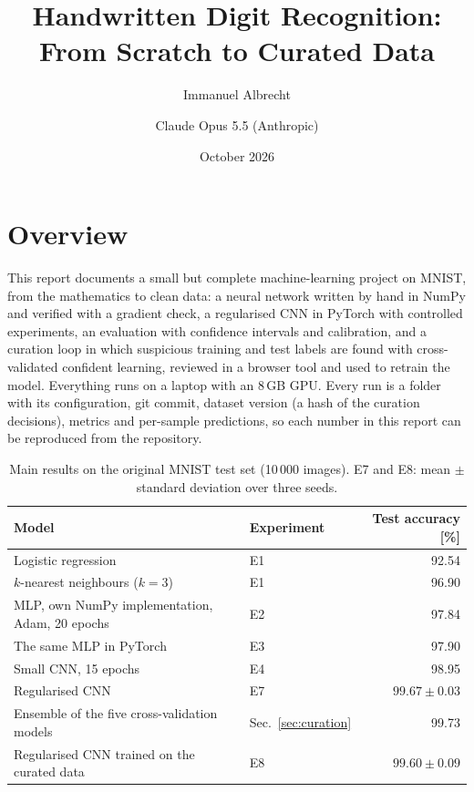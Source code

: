 \documentclass[11pt,a4paper]{article}
\title{Handwritten Digit Recognition: From Scratch to Curated Data}
\author{Immanuel Albrecht \and Claude Opus 5.5 (Anthropic)}
\date{October 2026}
\newcommand{\1}{\mathbf{1}}
\begin{document}
\maketitle


\section{Overview}
\label{sec:overview}

This report documents a small but complete machine-learning project on MNIST, from the
mathematics to clean data: a neural network written by hand in NumPy and verified with a
gradient check, a regularised CNN in PyTorch with controlled experiments, an evaluation with
confidence intervals and calibration, and a curation loop in which suspicious training and test
labels are found with cross-validated confident learning, reviewed in a browser tool and used to
retrain the model. Everything runs on a laptop with an 8\,GB GPU. Every run is a folder with its
configuration, git commit, dataset version (a hash of the curation decisions), metrics and
per-sample predictions, so each number in this report can be reproduced from the repository.

\begin{table}[ht]
  \centering
  \small
  \caption{Main results on the original MNIST test set (10\,000 images). E7 and E8: mean
    $\pm$ standard deviation over three seeds.}
  \label{tab:summary}
  \begin{tabular}{llr}
    \toprule
    Model & Experiment & Test accuracy [\%] \\
    \midrule
    Logistic regression & E1 & 92.54 \\
    $k$-nearest neighbours ($k = 3$) & E1 & 96.90 \\
    MLP, own NumPy implementation, Adam, 20 epochs & E2 & 97.84 \\
    The same MLP in PyTorch & E3 & 97.90 \\
    Small CNN, 15 epochs & E4 & 98.95 \\
    Regularised CNN & E7 & $99.67 \pm 0.03$ \\
    Ensemble of the five cross-validation models & Sec.~\ref{sec:curation} & 99.73 \\
    Regularised CNN trained on the curated data & E8 & $99.60 \pm 0.09$ \\
    \bottomrule
  \end{tabular}
\end{table}
\end{document}

